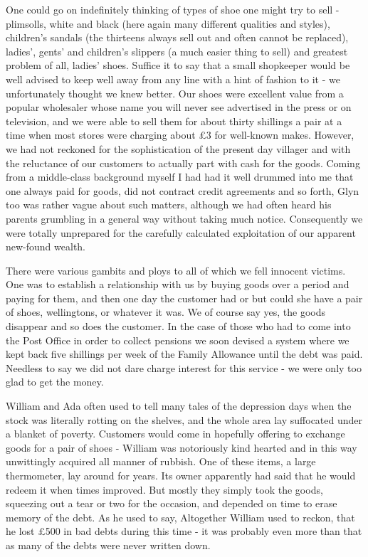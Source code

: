 One could go on indefinitely thinking of types of shoe one might try to sell - plimsolls, white and black (here again many different qualities and styles), children's sandals (the thirteens always sell out and often cannot be replaced), ladies', gents' and children's slippers (a much easier thing to sell) and greatest problem of all, ladies' shoes. Suffice it to say that a small shopkeeper would be well advised to keep well away from any line with a hint of fashion to it - we unfortunately thought we knew better. Our shoes were excellent value from a popular wholesaler whose name you will never see advertised in the press or on television, and we were able to sell them for about thirty shillings a pair at a time when most stores were charging about £3 for well-known makes. However, we had not reckoned for the sophistication of the present day villager and with the reluctance of our customers to actually part with cash for the goods. Coming from a middle-class background myself I had had it well drummed into me that one always paid for goods, did not contract credit agreements and so forth, Glyn too was rather vague about such matters, although we had often heard his parents grumbling in a general way without taking much notice. Consequently we were totally unprepared for the carefully calculated exploitation of our apparent new-found wealth.

There were various gambits and ploys to all of which we fell innocent victims. One was to establish a relationship with us by buying goods over a period and paying for them, and then one day the customer had  or  but could she have a pair of shoes, wellingtons, or whatever it was. We of course say yes, the goods disappear and so does the customer. In the case of those who had to come into the Post Office in order to collect pensions we soon devised a system where we kept back five shillings per week of the Family Allowance until the debt was paid. Needless to say we did not dare charge interest for this service - we were only too glad to get the money.

William and Ada often used to tell many tales of the depression days when the stock was literally rotting on the shelves, and the whole area lay suffocated under a blanket of poverty. Customers would come in hopefully offering to exchange goods for a pair of shoes - William was notoriously kind hearted and in this way unwittingly acquired all manner of rubbish. One of these items, a large thermometer, lay around for years. Its owner apparently had said that he would redeem it when times improved. But mostly they simply took the goods, squeezing out a tear or two for the occasion, and depended on time to erase memory of the debt. As he used to say,  Altogether William used to reckon, that he lost £500 in bad debts during this time - it was probably even more than that as many of the debts were never written down.

